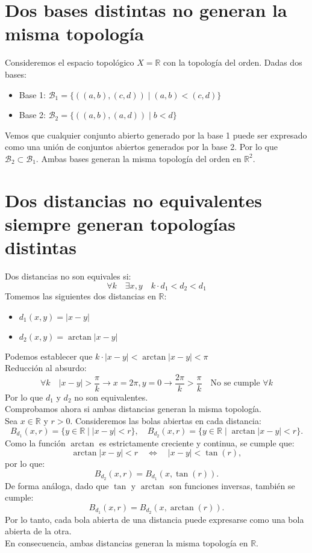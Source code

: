 \documentclass[12pt]{article}
\begin{document}
\section*{Dos bases distintas no generan la misma topología}
Consideremos el espacio topológico \( X = \mathbb{R} \) con la topología del orden.
Dadas dos bases:
\begin{itemize}
    \item Base 1: \(\mathcal{B}_1 = \{((a,b), (c,d)) \mid (a,b) < (c,d)\}\)
    \item Base 2: \(\mathcal{B}_2 = \{((a,b), (a,d)) \mid b < d\}\)
\end{itemize}
Vemos que cualquier conjunto abierto generado por la base 1 puede ser expresado como una unión de conjuntos abiertos generados por la base 2. Por lo que \(\mathcal{B}_2 \subset \mathcal{B}_1\). Ambas bases generan la misma topología del orden en \( \mathbb{R}^2 \).
\section*{Dos distancias no equivalentes siempre generan topologías distintas}
Dos distancias no son equivales si:
\[
\forall k \quad \exists x,y \quad k \cdot d_1 < d_2 < d_1
\]
Tomemos las siguientes dos distancias en \( \mathbb{R}\):
\begin{itemize}
    \item \( d_1(x,y) = |x-y| \)
    \item \( d_2(x,y) = \arctan|x - y| \)
\end{itemize}
Podemos establecer que \(k \cdot |x-y| < \arctan|x - y| < \pi\) \\
Reducción al absurdo: 
\[
\forall k \quad |x-y| > \frac{\pi}{k} \rightarrow{x=2\pi, y=0} \rightarrow \frac{2\pi}{k} > \frac{\pi}{k} \quad \text{No se cumple } \forall k
\]
Por lo que \(d_1\) y \(d_2\) no son equivalentes. \\
Comprobamos ahora si ambas distancias generan la misma topología. \\
Sea \(x \in \mathbb{R}\) y \(r > 0\). Consideremos las bolas abiertas en cada distancia:
\[
B_{d_1}(x, r) = \{ y \in \mathbb{R} \mid |x - y| < r \}, \quad 
B_{d_2}(x, r) = \{ y \in \mathbb{R} \mid \arctan|x - y| < r \}.
\]
Como la función \(\arctan\) es estrictamente creciente y continua, se cumple que:
\[
\arctan|x - y| < r \quad \Leftrightarrow \quad |x - y| < \tan(r),
\]
por lo que:
\[
B_{d_2}(x, r) = B_{d_1}(x, \tan(r)).
\]
De forma análoga, dado que \(\tan\) y \(\arctan\) son funciones inversas, también se cumple:
\[
B_{d_1}(x, r) = B_{d_2}(x, \arctan(r)).
\]
Por lo tanto, cada bola abierta de una distancia puede expresarse como una bola abierta de la otra. \\
En consecuencia, ambas distancias generan la misma topología en \(\mathbb{R}\).
\end{document}

